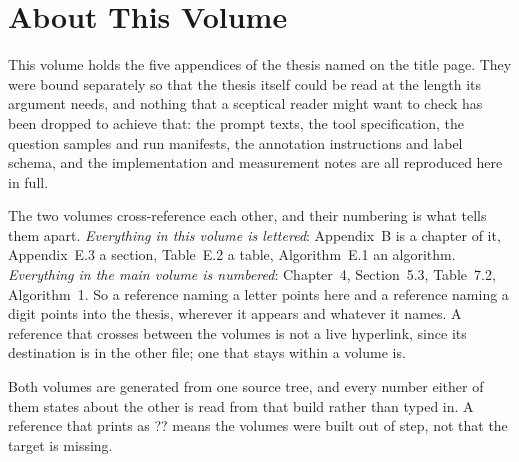\documentclass[12pt,notitlepage,oneside]{report}
\begin{document}
\chapter*{About This Volume}

This volume holds the five appendices of the thesis named on the title page.
They were bound separately so that the thesis itself could be read at the
length its argument needs, and nothing that a sceptical reader might want to
check has been dropped to achieve that: the prompt texts, the tool
specification, the question samples and run manifests, the annotation
instructions and label schema, and the implementation and measurement notes
are all reproduced here in full.

The two volumes cross-reference each other, and their numbering is what tells
them apart. \emph{Everything in this volume is lettered}: Appendix~B is a
chapter of it, Appendix~E.3 a section, Table~E.2 a table, Algorithm~E.1 an
algorithm. \emph{Everything in the main volume is numbered}: Chapter~4,
Section~5.3, Table~7.2, Algorithm~1. So a reference naming a letter points
here and a reference naming a digit points into the thesis, wherever it
appears and whatever it names. A reference that crosses between the volumes
is not a live hyperlink, since its destination is in the other file; one that
stays within a volume is.

Both volumes are generated from one source tree, and every number either of
them states about the other is read from that build rather than typed in. A
reference that prints as \textsf{??} means the volumes were built out of step,
not that the target is missing.

\appendix
{}






\end{document}
